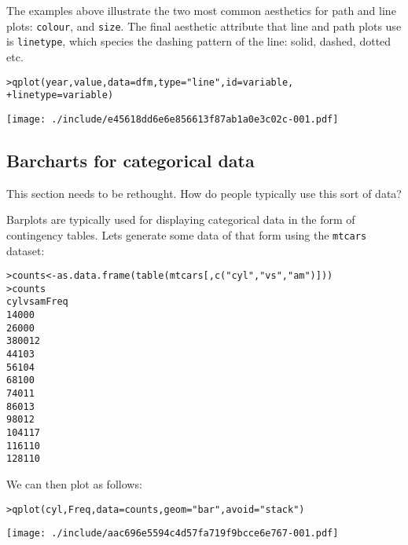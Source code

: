 The examples above illustrate the two most common aesthetics for path and line plots: {\tt colour}, and {\tt size}.  The final aesthetic attribute that line and path plots use is {\tt linetype}, which species the dashing pattern of the line: solid, dashed, dotted etc.

\begin{alltt}
> qplot(year, value, data = dfm, type = "line", id = variable, 
+     linetype = variable)
\end{alltt}
\texttt{[image: ./include/e45618dd6e6e856613f87ab1a0e3c02c-001.pdf]}
\begin{alltt}

\end{alltt}

\subsection{Barcharts for categorical data}\label{sub:bar_plots}

This section needs to be rethought.  How do people typically use this sort of data?

Barplots are typically used for displaying categorical data in the form of contingency tables.  Lets generate some data of that form using the {\tt mtcars} dataset:

\begin{alltt}
> counts <- as.data.frame(table(mtcars[, c("cyl", "vs", "am")]))
> counts
   cyl vs am Freq
1    4  0  0    0
2    6  0  0    0
3    8  0  0   12
4    4  1  0    3
5    6  1  0    4
6    8  1  0    0
7    4  0  1    1
8    6  0  1    3
9    8  0  1    2
10   4  1  1    7
11   6  1  1    0
12   8  1  1    0

\end{alltt}

We can then plot as follows:

\begin{alltt}
> qplot(cyl, Freq, data = counts, geom = "bar", avoid = "stack")
\end{alltt}
\texttt{[image: ./include/aac696e5594c4d57fa719f9bcce6e767-001.pdf]}
\begin{alltt}

\end{alltt}

